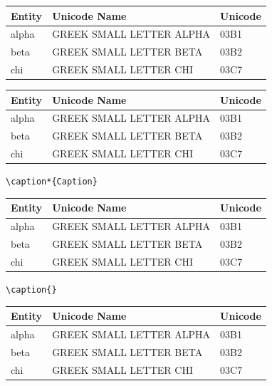\documentclass[a4paper]{article}
\begin{document}
\begingroup
\begin{center}
\begin{supertabular}{lll}
\bfseries Entity&\bfseries  Unicode Name&\bfseries  Unicode\\
\hline
alpha              & GREEK SMALL LETTER ALPHA            & 03B1\\
beta               & GREEK SMALL LETTER BETA             & 03B2\\
chi                & GREEK SMALL LETTER CHI              & 03C7\\
\end{supertabular}
\end{center}

\captionsetup[supertabular]{labelsep=colon}

\begin{center}
\begin{supertabular}{lll}
\bfseries Entity&\bfseries  Unicode Name&\bfseries  Unicode\\
\hline
alpha              & GREEK SMALL LETTER ALPHA            & 03B1\\
beta               & GREEK SMALL LETTER BETA             & 03B2\\
chi                & GREEK SMALL LETTER CHI              & 03C7\\
\end{supertabular}
\end{center}
\endgroup

\captionsetup{debug=1}

\verb|\caption*{Caption}|
\begin{center}
\begin{supertabular}{lll}
\bfseries Entity&\bfseries  Unicode Name&\bfseries  Unicode\\
\hline
alpha              & GREEK SMALL LETTER ALPHA            & 03B1\\
beta               & GREEK SMALL LETTER BETA             & 03B2\\
chi                & GREEK SMALL LETTER CHI              & 03C7\\
\end{supertabular}
\end{center}

\verb|\caption{}|
\begin{center}
\tablecaption{}
\begin{supertabular}{lll}
\bfseries Entity&\bfseries  Unicode Name&\bfseries  Unicode\\
\hline
alpha              & GREEK SMALL LETTER ALPHA            & 03B1\\
beta               & GREEK SMALL LETTER BETA             & 03B2\\
chi                & GREEK SMALL LETTER CHI              & 03C7\\
\end{supertabular}
\end{center}
\end{document}
